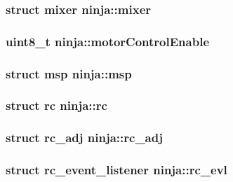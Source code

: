 \hypertarget{structninja_ab1b0a20ef8f44edfd621047034ffff04}{
\subsubsection[{mixer}]{\setlength{\rightskip}{0pt plus 5cm}struct {\bf mixer} ninja\+::mixer}}\label{structninja_ab1b0a20ef8f44edfd621047034ffff04}
\hypertarget{structninja_af8efd0b7d763360c87635090d0c695b7}{
\subsubsection[{motor\+Control\+Enable}]{\setlength{\rightskip}{0pt plus 5cm}uint8\+\_\+t ninja\+::motor\+Control\+Enable}}\label{structninja_af8efd0b7d763360c87635090d0c695b7}
\hypertarget{structninja_a56f4ff8bff5033e0140f6533594a81ee}{
\subsubsection[{msp}]{\setlength{\rightskip}{0pt plus 5cm}struct {\bf msp} ninja\+::msp}}\label{structninja_a56f4ff8bff5033e0140f6533594a81ee}
\hypertarget{structninja_add741241fe575999e970c52a08dde381}{
\subsubsection[{rc}]{\setlength{\rightskip}{0pt plus 5cm}struct {\bf rc} ninja\+::rc}}\label{structninja_add741241fe575999e970c52a08dde381}
\hypertarget{structninja_a673840aecfee3f5687129d4920de8be5}{
\subsubsection[{rc\+\_\+adj}]{\setlength{\rightskip}{0pt plus 5cm}struct {\bf rc\+\_\+adj} ninja\+::rc\+\_\+adj}}\label{structninja_a673840aecfee3f5687129d4920de8be5}
\hypertarget{structninja_a6f1a781eaf3203ecee063d26b42e7fe8}{
\subsubsection[{rc\+\_\+evl}]{\setlength{\rightskip}{0pt plus 5cm}struct {\bf rc\+\_\+event\+\_\+listener} ninja\+::rc\+\_\+evl}}\label{structninja_a6f1a781eaf3203ecee063d26b42e7fe8}
